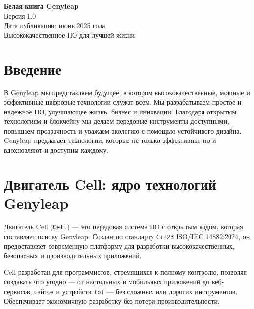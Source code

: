 \documentclass[a4paper,12pt,openany]{book}
\begin{document}
\begin{titlepage}
    \begin{center}
        \vspace*{1.5cm}
        {\Huge \textbf{Белая книга Genyleap}} \\
        \vspace{0.5cm}
        {\Large Версия 1.0} \\
        \vspace{0.5cm}
        {\large Дата публикации: июнь 2025 года} \\
        \vspace{1.5cm}
        {\large Высококачественное ПО для лучшей жизни} \\
    \end{center}
    \vfill
\end{titlepage}

\chapter{Введение}
В Genyleap мы представляем будущее, в котором высококачественные, мощные и эффективные цифровые технологии служат всем. Мы разрабатываем простое и надежное ПО, улучшающее жизнь, бизнес и инновации. Благодаря открытым технологиям и блокчейну мы делаем передовые инструменты доступными, повышаем прозрачность и уважаем экологию с помощью устойчивого дизайна. Genyleap предлагает технологии, которые не только эффективны, но и вдохновляют и доступны каждому.

\chapter{Двигатель Cell: ядро технологий Genyleap}

Двигатель Cell (\texttt{Cell}) — это передовая система ПО с открытым кодом, которая составляет основу Genyleap. Создан по стандарту \texttt{C++23} ISO/IEC 14882:2024, он предоставляет современную платформу для разработки высококачественных, безопасных и производительных приложений.

Cell разработан для программистов, стремящихся к полному контролю, позволяя создавать что угодно — от настольных и мобильных приложений до веб-сервисов, сайтов и устройств \texttt{IoT} — без сложных или дорогих инструментов. Обеспечивает экономичную разработку без потери производительности.
\end{document}
